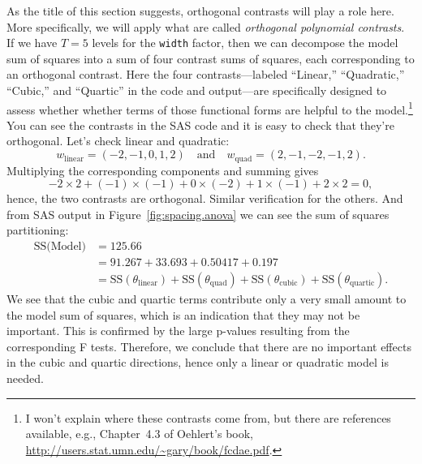 \documentclass[a4paper, 12pt]{article}
\theoremstyle{plain}
\theoremstyle{definition}
\theoremstyle{remark}
\begin{document}
As the title of this section suggests, orthogonal contrasts will play a role here.  More specifically, we will apply what are called {\em orthogonal polynomial contrasts}.  If we have $T=5$ levels for the {\tt width} factor, then we can decompose the model sum of squares into a sum of four contrast sums of squares, each corresponding to an orthogonal contrast.  Here the four contrasts---labeled ``Linear,'' ``Quadratic,'' ``Cubic,'' and ``Quartic'' in the code and output---are specifically designed to assess whether whether terms of those functional forms are helpful to the model.\footnote{I won't explain where these contrasts come from, but there are references available, e.g., Chapter~4.3 of Oehlert's book, \url{http://users.stat.umn.edu/~gary/book/fcdae.pdf}.}  You can see the contrasts in the SAS code and it is easy to check that they're orthogonal.  Let's check linear and quadratic: 
\[ w_{\text{linear}} = (-2, -1, 0, 1, 2) \quad \text{and} \quad w_{\text{quad}} = (2, -1, -2, -1, 2). \]
Multiplying the corresponding components and summing gives 
\[ %
-2\times 2+(-1)\times(-1)+0\times(-2)+1\times(-1)+2\times2=0, \]
hence, the two contrasts are orthogonal.  Similar verification for the others.  And from SAS output in Figure~\ref{fig:spacing.anova} we can see the sum of squares partitioning:
\begin{align*}
\text{SS(Model)} & = 125.66 \\
& = 91.267+33.693+0.50417+0.197 \\
& = \text{SS}(\theta_{\text{linear}}) + \text{SS}(\theta_{\text{quad}}) + \text{SS}(\theta_{\text{cubic}}) + \text{SS}(\theta_{\text{quartic}}). 
\end{align*}
We see that the cubic and quartic terms contribute only a very small amount to the model sum of squares, which is an indication that they may not be important.  This is confirmed by the large p-values resulting from the corresponding F tests.  Therefore, we conclude that there are no important effects in the cubic and quartic directions, hence only a linear or quadratic model is needed.  
\end{document}
